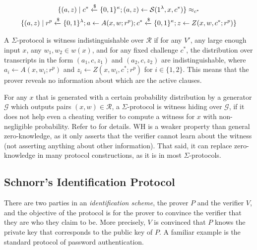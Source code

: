 \begin{definition}
\begin{enumerate}
    \begin{multline*}
        \{(a, z) \mid c^* \xleftarrow{\$} \{0,1\}^\kappa; (a,z) \leftarrow \mathcal S(1^\lambda,x,c^*)\} 
        \approx_{c^*} \\
        \{(a,z) \mid r^p \xleftarrow{\$} \{0,1\}^\lambda; a \leftarrow A(x,w;r^p); c^* \xleftarrow{\$} \{0,1\}^\kappa; z \leftarrow Z(x,w,c^*;r^p)\}
    \end{multline*}
\end{enumerate}
\end{definition}

\begin{definition}
A $\Sigma$-protocol is witness indistinguishable over $\mathcal R$ if for any $V'$, any large enough input $x$, any $w_1,w_2 \in w(x)$, and for any fixed challenge $c^*$, the distribution over transcripts in the form $(a_1, c, z_1)$ and $(a_2,c,z_2)$ are indistinguishable, where $a_i \leftarrow A(x,w_i;r^p)$ and $z_i \leftarrow Z(x,w_i, c^*; r^p)$ for $i \in \{1,2\}$. This means that the prover reveals no information about which are the active clauses. 
\end{definition}

\begin{definition}
For any $x$ that is generated with a certain probability distribution by a generator $\mathcal G$ which outputs pairs $(x,w) \in \mathcal R$, a $\Sigma$-protocol is witness hiding over $\mathcal G$, if it does not help even a cheating verifier to compute a witness for $x$ with non-negligible probability. Refer to \cite{10.1145/100216.100272} for details. WH is a weaker property than general zero-knowledge, as it only asserts that the verifier cannot learn about the witness (not asserting anything about other information). That said, it can replace zero-knowledge in many protocol constructions, as it is in most $\Sigma$-protocols.

\end{definition}


\subsection{Schnorr's Identification Protocol}
There are two parties in an \textit{identification scheme}, the prover $P$ and the verifier $V$, and the objective of the protocol is for the prover to convince the verifier that they are who they claim to be. More precisely, $V$ is convinced that $P$ knows the private key that corresponds to the public key of $P$. A familiar example is the standard protocol of password authentication.

